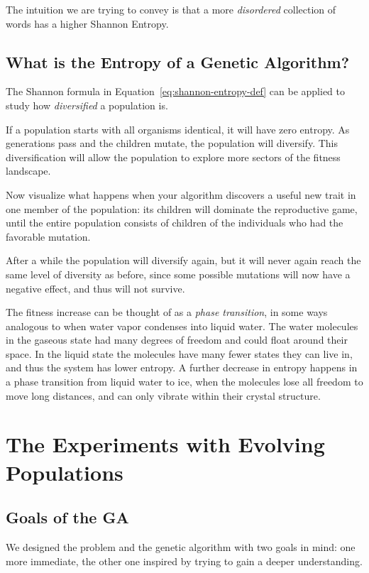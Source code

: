 \documentclass[11pt]{article}
\begin{document}
The intuition we are trying to convey is that a more \emph{disordered}
collection of words has a higher Shannon Entropy.


\subsection{What is the Entropy of a Genetic Algorithm?}

The Shannon formula in Equation~\ref{eq:shannon-entropy-def} can be
applied to study how \emph{diversified} a population is.

If a population starts with all organisms identical, it will have zero
entropy.  As generations pass and the children mutate, the population
will diversify.  This diversification will allow the population to
explore more sectors of the fitness landscape.

Now visualize what happens when your algorithm discovers a useful new
trait in one member of the population: its children will dominate the
reproductive game, until the entire population consists of children of
the individuals who had the favorable mutation.

After a while the population will diversify again, but it will never
again reach the same level of diversity as before, since some possible
mutations will now have a negative effect, and thus will not survive.

The fitness increase can be thought of as a \emph{phase transition},
in some ways analogous to when water vapor condenses into liquid
water.  The water molecules in the gaseous state had many degrees of
freedom and could float around their space.  In the liquid state the
molecules have many fewer states they can live in, and thus the system
has lower entropy.  A further decrease in entropy happens in a phase
transition from liquid water to ice, when the molecules lose all
freedom to move long distances, and can only vibrate within their
crystal structure.




\section{The Experiments with Evolving Populations}

\subsection{Goals of the GA}

We designed the problem and the genetic algorithm with two goals in
mind: one more immediate, the other one inspired by trying to gain a
deeper understanding.
\end{document}
